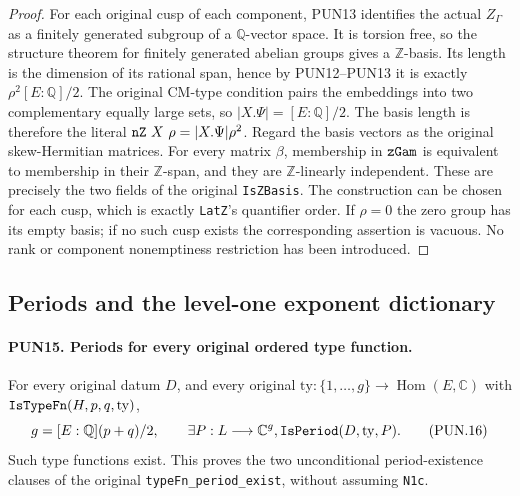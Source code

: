 \documentclass[11pt,a4paper]{article}
\numberwithin{equation}{section}
\theoremstyle{remark}\newtheorem{remark}[theorem]{Remark}
\begin{document}
\begin{proof}
For each original cusp of each component, PUN13 identifies the
actual \(Z_\Gamma\) as a finitely generated subgroup of a
\(\mathbb Q\)-vector space.  It is torsion free, so the
structure theorem for finitely generated abelian groups gives
a \(\mathbb Z\)-basis.  Its length is the dimension of its
rational span, hence by PUN12--PUN13 it is exactly
\(\rho^2[E:\mathbb Q]/2\).  The original CM-type condition
pairs the embeddings into two complementary equally large sets,
so \(|X.\Psi|=[E:\mathbb Q]/2\).  The basis length is therefore
the literal \(\texttt{n\allowbreak Z}\ X\ \rho=|X.\Psi|\rho^2\).
Regard the basis vectors as the
original skew-Hermitian matrices.  For every matrix \(\beta\),
membership in \(\texttt{z\allowbreak Gam}\) is equivalent to membership
in their \(\mathbb Z\)-span, and they are \(\mathbb Z\)-linearly
independent.  These are precisely the two fields of the original
\texttt{Is\allowbreak ZBasis}.  The construction can be chosen for each cusp,
which is exactly \texttt{Lat\allowbreak Z}'s quantifier order.  If \(\rho=0\)
the zero group has its empty basis; if no such cusp exists the
corresponding assertion is vacuous.  No rank or component
nonemptiness restriction has been introduced.
\end{proof}

\subsection{Periods and the level-one exponent dictionary}

\paragraph{PUN15. Periods for every original ordered type function.}
\label{claim:PUN15}
For every original datum \(D\), and every original
\(\mathrm{ty}:\{1,\ldots,g\}\to\operatorname{Hom}(E,\mathbb C)\)
with \(\texttt{Is\allowbreak Type\allowbreak Fn}(H,p,q,\mathrm{ty})\),
\[
 g=[E:\mathbb Q](p+q)/2,
 \qquad \exists P:L\longrightarrow\mathbb C^g,
                           \texttt{Is\allowbreak Period}(D,\mathrm{ty},P).
 \tag{PUN.16}
\]
Such type functions exist.  This proves the two unconditional
period-existence clauses of the original
\texttt{type\allowbreak Fn\_\allowbreak period\_\allowbreak exist}, without assuming \texttt{N1c}.
\end{document}
